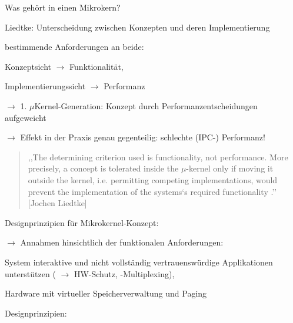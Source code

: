 \documentclass[a4paper]{article}
\begin{document}
\begin{multicols}{3}
    \begin{itemize*}
        \item
        Was gehört in einen Mikrokern?
        \begin{itemize*}
            \item Liedtke: Unterscheidung zwischen Konzepten und deren Implementierung
            \item bestimmende Anforderungen an beide: \begin{itemize*} \item Konzeptsicht $\rightarrow$ Funktionalität, \item Implementierungssicht $\rightarrow$ Performanz \end{itemize*}
            \item $\rightarrow$ 1. $\mu$Kernel-Generation: Konzept durch Performanzentscheidungen aufgeweicht
            \item $\rightarrow$ Effekt in der Praxis genau gegenteilig: schlechte (IPC-) Performanz!
        \end{itemize*}
    \end{itemize*}

    \begin{quote}
        ,,The determining criterion used is functionality, not performance. More
        precisely, a concept is tolerated inside the $\mu$-kernel only if moving it
        outside the kernel, i.e. permitting competing implementations, would
        prevent the implementation of the systems`s required functionality .''
        [Jochen Liedtke]
    \end{quote}

    Designprinzipien für Mikrokernel-Konzept:

    \begin{itemize*}
        \item
        $\rightarrow$ Annahmen hinsichtlich der funktionalen
        Anforderungen:
    \end{itemize*}

    \begin{enumerate*}
        \item
        System interaktive und nicht vollständig vertrauenswürdige
        Applikationen unterstützen ( $\rightarrow$ HW-Schutz,
        -Multiplexing),
        \item
        Hardware mit virtueller Speicherverwaltung und Paging
    \end{enumerate*}

    Designprinzipien:


\end{multicols}
\end{document}
